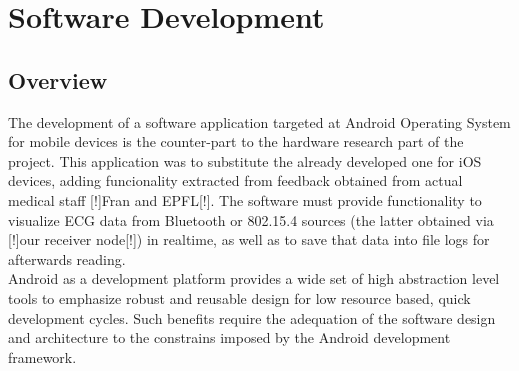 \chapter{Software Development} %
\label{ch:swdev}


	\section{Overview}

	\begin{comment}
		Microestado del arte:
		Desarrollo para dispositivos android, paradigma particular, no estamos formados en él (y esto ha dado problemas), 
arquitecturas muy particulares, en el momento de comenzar el desarrollo documentación buena pero muy técnica, más para consulta que para formación. Versiones de android para usb host, … => impone requisitos al dispositivo tablet
    (Posibilidad de hilos destruidos en cada momento, atender al giro de pantalla, destrucción de la actividad, …)
    Limitaciones de android como plataforma (java vm, opengl, …)
    Aplicación iphone: funcionalidad limitada, captura de requisitos comenzó por ella, crear un producto a partir del prototipo.
    Se añadió feedback de los médicos con que trabaja Fran en Murcia (Preguntar a Recas) (en particular los logs!)

	\end{comment}

	The development of a software application targeted at Android Operating System for mobile devices is the counter-part to the hardware research part of the project.
	This application was to substitute the already developed one for iOS devices, adding funcionality extracted from feedback obtained from actual medical staff [!]Fran and EPFL[!]. The software must provide functionality to visualize ECG data from Bluetooth or 802.15.4 sources (the latter obtained via [!]our receiver node[!]) in realtime, as well as to save that data into file logs for afterwards reading.\\

	Android as a development platform provides a wide set of high abstraction level tools to emphasize robust and reusable design for low resource based, quick development cycles. Such benefits require the adequation of the software design and architecture to the constrains imposed by the Android development framework.\\

